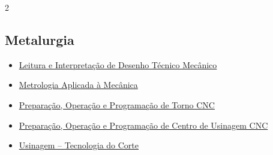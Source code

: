 \documentclass[10.5pt,a4paper]{article}
\begin{document}
\begin{paracol}{2}
\subsection*{Metalurgia}
\begin{itemize}[leftmargin=1.1em, itemsep=0.05em, label=\textcolor{corprincipal}{\small\faAngleRight}]
  \small
  \item \href{https://kaickbb.github.io/CV/files/Certificado_LeituraInterpretacaoDesenhoTecnicoMecanico.pdf}{Leitura e Interpretação de Desenho Técnico Mecânico}
  \item \href{https://kaickbb.github.io/CV/files/Certificado_MetrologiaAplicadaMecanica.pdf}{Metrologia Aplicada à Mecânica}
  \item \href{https://kaickbb.github.io/CV/files/Certificado_PreparacaoOperacaoProgramacaoTornoCNC.pdf}{Preparação, Operação e Programação de Torno CNC}
  \item \href{https://kaickbb.github.io/CV/files/Certificado_ProgramacaoCentroUsinagemCNC.pdf}{Preparação, Operação e Programação de Centro de Usinagem CNC}
  \item \href{https://kaickbb.github.io/CV/files/Certificado_TecnologiaCorte.pdf}{Usinagem -- Tecnologia do Corte}
\end{itemize}

\end{paracol}
\end{document}
